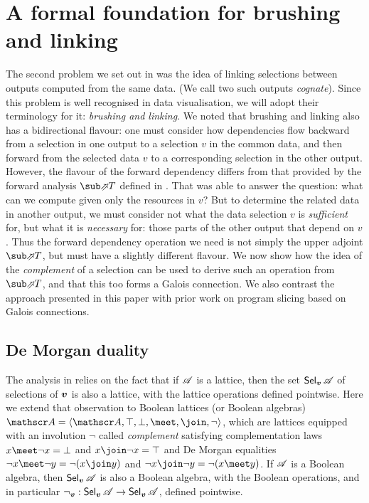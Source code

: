 \section{A formal foundation for brushing and linking}
\label{sec:toolkit}

The second problem we set out in  was the idea of linking selections between outputs computed from the same data. (We call two such outputs \emph{cognate}). Since this problem is well recognised in data visualisation, we will adopt their terminology for it: \emph{brushing and linking}. We noted that brushing and linking also has a bidirectional flavour: one must consider how dependencies flow backward from a selection in one output to a selection $v$ in the common data, and then forward from the selected data $v$ to a corresponding selection in the other output. However, the flavour of the forward dependency differs from that provided by the forward analysis $\evalFwdF{T}$ defined in . That was able to answer the question: what can we compute given only the resources in $v$? But to determine the related data in another output, we must consider not what the data selection $v$ is \emph{sufficient} for, but what it is \emph{necessary} for: those parts of the other output that depend on $v$. Thus the forward dependency operation we need is not simply the upper adjoint $\evalFwdF{T}$, but must have a slightly different flavour. We now show how the idea of the \emph{complement} of a selection can be used to derive such an operation from $\evalFwdF{T}$, and that this too forms a Galois connection. We also contrast the approach presented in this paper with prior work on program slicing based on Galois connections.



\subsection{De Morgan duality}


The analysis in  relies on the fact that if $\mathscr{A}$ is a lattice, then the set $\textup{\textsf{Sel}}_{\bm{v}}\,{\mathscr{A}}$ of selections of $\bm{v}$ is also a lattice, with the lattice operations defined pointwise. Here we extend that observation to Boolean lattices (or Boolean algebras) $\Ann{A}= \BoolLattice{\Ann{A}}{\top}{\bot}{\meet}{\join}{\neg}$, which are lattices equipped with an involution $\neg$ called \emph{complement} satisfying complementation laws $x \meet \neg x = \bot$ and $x \join \neg x = \top$ and De Morgan equalities $\neg x \meet \neg y = \neg(x \join y)$ and $\neg x \join \neg y = \neg(x \meet y)$. If $\mathscr{A}$ is a Boolean algebra, then $\textup{\textsf{Sel}}_{\bm{v}}\,{\mathscr{A}}$ is also a Boolean algebra, with the Boolean operations, and in particular $\neg_{\bm{v}}: \textup{\textsf{Sel}}_{\bm{v}}\,{\mathscr{A}} \to \textup{\textsf{Sel}}_{\bm{v}}\,{\mathscr{A}}$, defined pointwise.

